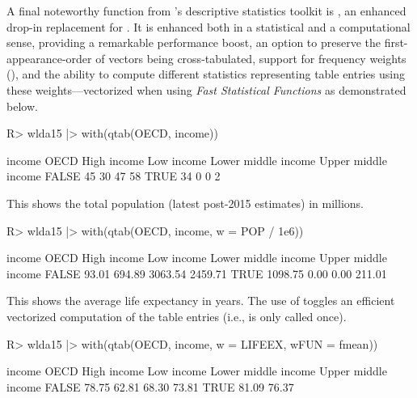 \documentclass[nojss]{jss} %
\newcommand{\fct}[1]{\code{#1()}}
\begin{document}
A final noteworthy function from 's descriptive statistics toolkit is \fct{qtab}, an enhanced drop-in replacement for \fct{table}. It is enhanced both in a statistical and a computational sense, providing a remarkable performance boost, an option  to preserve the first-appearance-order of vectors being cross-tabulated, support for frequency weights (), and the ability to compute different statistics representing table entries using these weights---vectorized when using \emph{Fast Statistical Functions} as demonstrated below.
%
\begin{Schunk}
\begin{Sinput}
R> wlda15 |> with(qtab(OECD, income))
\end{Sinput}
\begin{Soutput}
       income
OECD    High income Low income Lower middle income Upper middle income
  FALSE          45         30                  47                  58
  TRUE           34          0                   0                   2
\end{Soutput}
\end{Schunk}
This shows the total population (latest post-2015 estimates) in millions.
\begin{Schunk}
\begin{Sinput}
R> wlda15 |> with(qtab(OECD, income, w = POP / 1e6))
\end{Sinput}
\begin{Soutput}
       income
OECD    High income Low income Lower middle income Upper middle income
  FALSE       93.01     694.89             3063.54             2459.71
  TRUE      1098.75       0.00                0.00              211.01
\end{Soutput}
\end{Schunk}
This shows the average life expectancy in years. The use of \fct{fmean} toggles an efficient vectorized computation of the table entries (i.e., \fct{fmean} is only called once).
\begin{Schunk}
\begin{Sinput}
R> wlda15 |> with(qtab(OECD, income, w = LIFEEX, wFUN = fmean))
\end{Sinput}
\begin{Soutput}
       income
OECD    High income Low income Lower middle income Upper middle income
  FALSE       78.75      62.81               68.30               73.81
  TRUE        81.09                                              76.37
\end{Soutput}
\end{Schunk}
\end{document}
